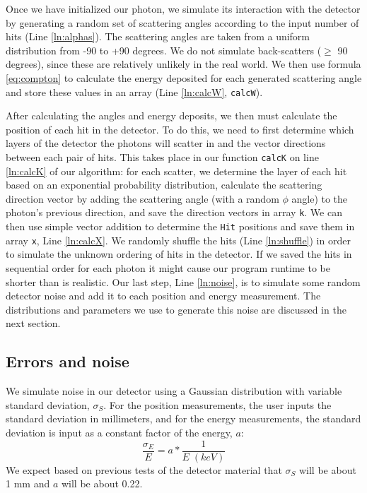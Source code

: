 Once we have initialized our photon, we simulate its interaction with the detector by generating a random set of scattering angles according to the input number of hits (Line \ref{ln:alphas}). The scattering angles are taken from a uniform distribution from -90 to +90 degrees. We do not simulate back-scatters ($\geq$ 90 degrees), since these are relatively unlikely in the real world. We then use formula \ref{eq:compton} to calculate the energy deposited for each generated scattering angle and store these values in an array (Line \ref{ln:calcW}, \texttt{calcW}).

After calculating the angles and energy deposits, we then must calculate the position of each hit in the detector. To do this, we need to first determine which layers of the detector the photons will scatter in and the vector directions between each pair of hits. This takes place in our function \texttt{calcK} on line \ref{ln:calcK} of our algorithm: for each scatter, we determine the layer of each hit based on an exponential probability distribution, calculate the scattering direction vector by adding the scattering angle (with a random $\phi$ angle) to the photon's previous direction, and save the direction vectors in array \texttt{k}. We can then use simple vector addition to determine the \texttt{Hit} positions and save them in array \texttt{x}, Line \ref{ln:calcX}. We randomly shuffle the hits (Line \ref{ln:shuffle}) in order to simulate the unknown ordering of hits in the detector. If we saved the hits in sequential order for each photon it might cause our program runtime to be shorter than is realistic. Our last step, Line \ref{ln:noise}, is to simulate some random detector noise and add it to each position and energy measurement. The distributions and parameters we use to generate this noise are discussed in the next section.

\subsection{Errors and noise} \label{noise}
We simulate noise in our detector using a Gaussian distribution with variable standard deviation, $\sigma_S$. For the position measurements, the user inputs the standard deviation in millimeters, and for the energy measurements, the standard deviation is input as a constant factor of the energy, $a$:
\begin{equation}\label{eq:sigE}
\frac{\sigma_E}{E} = a*\frac{1}{E \; (keV)}
\end{equation}
We expect based on previous tests of the detector material that $\sigma_S$ will be about 1 mm and $a$ will be about 0.22.

